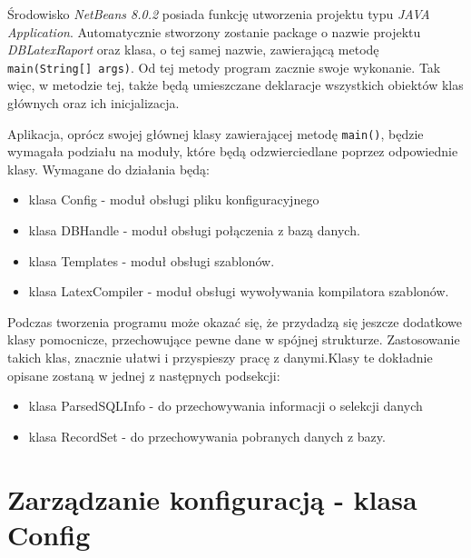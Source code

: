 Środowisko \emph{NetBeans 8.0.2} posiada funkcję utworzenia projektu typu \emph{JAVA Application}. Automatycznie stworzony zostanie package o nazwie projektu \emph{DBLatexRaport} oraz klasa, o tej samej nazwie, zawierającą metodę \texttt{main(String[] args)}. Od tej metody program zacznie swoje wykonanie. Tak więc, w metodzie tej, także będą umieszczane deklaracje wszystkich obiektów klas głównych oraz ich inicjalizacja. 
\par 
Aplikacja, oprócz swojej głównej klasy zawierającej metodę \texttt{main()}, będzie wymagała podziału na moduły, które będą odzwierciedlane poprzez odpowiednie klasy. Wymagane do działania będą:
\begin{itemize}
\item klasa Config - moduł obsługi pliku konfiguracyjnego 
\item klasa DBHandle - moduł obsługi połączenia z bazą danych.
\item klasa Templates - moduł obsługi szablonów.
\item klasa LatexCompiler -  moduł obsługi wywoływania kompilatora szablonów.
\end{itemize}
\vspace{5mm}
Podczas tworzenia programu może okazać się, że przydadzą się jeszcze dodatkowe klasy pomocnicze, przechowujące pewne dane w spójnej strukturze. Zastosowanie takich klas, znacznie ułatwi i przyspieszy pracę z danymi.Klasy te dokładnie opisane zostaną w jednej z następnych podsekcji:
\begin{itemize}
\item klasa ParsedSQLInfo - do przechowywania informacji o selekcji danych
\item klasa RecordSet - do przechowywania pobranych danych z bazy.
\end{itemize}

\section{Zarządzanie konfiguracją - klasa Config}


